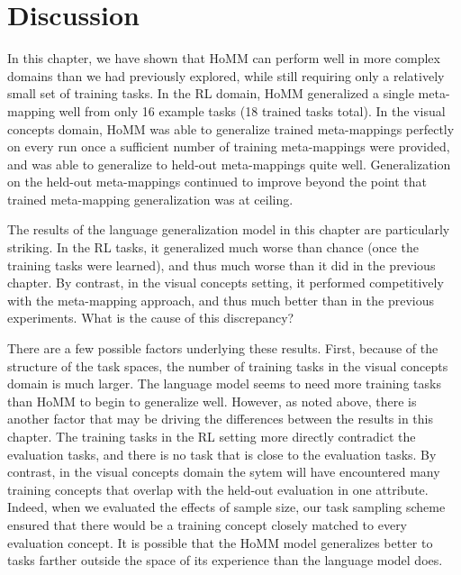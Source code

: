 \section{Discussion}

In this chapter, we have shown that HoMM can perform well in more complex domains than we had previously explored, while still requiring only a relatively small set of training tasks. In the RL domain, HoMM generalized a single meta-mapping well from only 16 example tasks (18 trained tasks total). In the visual concepts domain, HoMM was able to generalize trained meta-mappings perfectly on every run once a sufficient number of training meta-mappings were provided, and was able to generalize to held-out meta-mappings quite well. Generalization on the held-out meta-mappings continued to improve beyond the point that trained meta-mapping generalization was at ceiling. \par 

The results of the language generalization model in this chapter are particularly striking. In the RL tasks, it generalized much worse than chance (once the training tasks were learned), and thus much worse than it did in the previous chapter. By contrast, in the visual concepts setting, it performed competitively with the meta-mapping approach, and thus much better than in the previous experiments. What is the cause of this discrepancy? \par 

There are a few possible factors underlying these results. First, because of the structure of the task spaces, the number of training tasks in the visual concepts domain is much larger. The language model seems to need more training tasks than HoMM to begin to generalize well. However, as noted above, there is another factor that may be driving the differences between the results in this chapter. The training tasks in the RL setting more directly contradict the evaluation tasks, and there is no task that is close to the evaluation tasks. By contrast, in the visual concepts domain the sytem will have encountered many training concepts that overlap with the held-out evaluation in one attribute. Indeed, when we evaluated the effects of sample size, our task sampling scheme ensured that there would be a training concept closely matched to every evaluation concept. It is possible that the HoMM model generalizes better to tasks farther outside the space of its experience than the language model does. \par  

